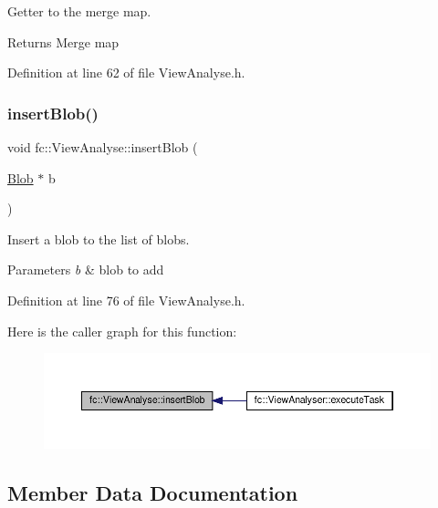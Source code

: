 Getter to the merge map. 

\begin{DoxyReturn}{Returns}
Merge map 
\end{DoxyReturn}


Definition at line 62 of file View\+Analyse.\+h.

\mbox{\label{classfc_1_1ViewAnalyse_a3e319a372ebecb594a2d728a110f1be5}} 
\subsubsection{\texorpdfstring{insert\+Blob()}{insertBlob()}}
{\footnotesize\ttfamily void fc\+::\+View\+Analyse\+::insert\+Blob (\begin{DoxyParamCaption}\item[{\hyperlink{classfc_1_1Blob}{Blob} $\ast$}]{b }\end{DoxyParamCaption})\hspace{0.3cm}{\ttfamily [inline]}}



Insert a blob to the list of blobs. 


\begin{DoxyParams}{Parameters}
{\em b} & blob to add \\
\hline
\end{DoxyParams}


Definition at line 76 of file View\+Analyse.\+h.

Here is the caller graph for this function\+:
\nopagebreak
\begin{figure}[H]
\begin{center}
\leavevmode
\includegraphics[width=350pt]{d8/d72/classfc_1_1ViewAnalyse_a3e319a372ebecb594a2d728a110f1be5_icgraph}
\end{center}
\end{figure}


\subsection{Member Data Documentation}
\mbox{\label{classfc_1_1ViewAnalyse_a209772ce7d1b046c21eaaf3e13cbb4d5}} 
